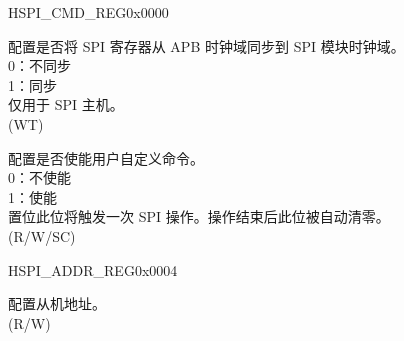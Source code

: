 \begin{register}{H}{SPI\_CMD\_REG}{0x0000}\label{regdesc:SPI3CMDREG}
%
%
%
%
\regnewline%
\begin{regdesc}\begin{reglist}
\label{fielddesc:SPI3UPDATE}\item [SPI\_UPDATE]配置是否将 SPI 寄存器从 APB 时钟域同步到 SPI 模块时钟域。\\
0：不同步\\
1：同步\\
仅用于 SPI 主机。\\ (WT)
\label{fielddesc:SPI3USR}\item [SPI\_USR] 配置是否使能用户自定义命令。 \\
0：不使能 \\
1：使能 \\
置位此位将触发一次 SPI 操作。操作结束后此位被自动清零。 \\
(R/W/SC)
\end{reglist}\end{regdesc}
\end{register}


\begin{register}{H}{SPI\_ADDR\_REG}{0x0004}\label{regdesc:SPI3ADDRREG}
%
\regnewline%
\begin{regdesc}\begin{reglist}
\label{fielddesc:SPI3USRADDRVALUE}\item [SPI\_USR\_ADDR\_VALUE] 配置从机地址。\\
(R/W)
\end{reglist}\end{regdesc}
\end{register}


